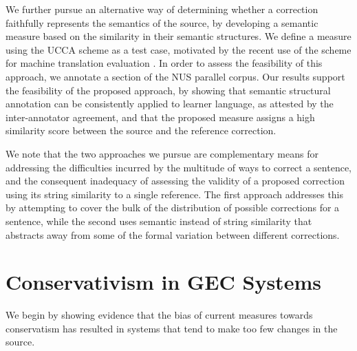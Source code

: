 \documentclass[english]{article}
\begin{document}
We further pursue an alternative way of determining whether a correction faithfully
represents the semantics of the source, by developing a semantic measure based on the similarity
in their semantic structures. We define a measure using the UCCA scheme \cite{abend2013universal} as a
test case, motivated by the recent use of the scheme for machine translation evaluation \cite{birch2016hume}.
In order to assess the feasibility of this approach, we annotate a section of the NUS \cite{dahlmeier2013building}
parallel corpus. Our results support the feasibility of the proposed approach,
by showing that semantic structural annotation can be consistently applied
to learner language, as attested by the inter-annotator agreement,
and that the proposed measure assigns a high similarity score between the source and the reference
correction.

We note that the two approaches we pursue are complementary means for addressing the difficulties
incurred by the multitude of ways to correct a sentence, and the consequent inadequacy of assessing
the validity of a proposed correction using its string similarity to a single reference.
The first approach addresses this by attempting to cover the bulk of the distribution of possible
corrections for a sentence, while the second uses semantic instead of string similarity that abstracts
away from some of the formal variation between different corrections.

\section{Conservativism in GEC Systems}\label{sec:formal_conservatism}



We begin by showing evidence that the bias of current measures towards conservatism
has resulted in systems that tend to make too few changes in the source. 
\end{document}
